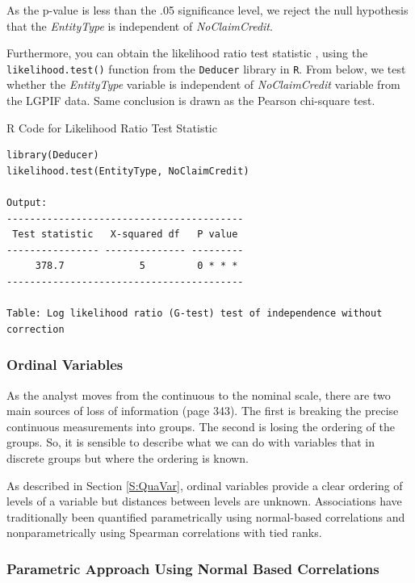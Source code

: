 \documentclass[]{book}
\theoremstyle{definition}
\theoremstyle{definition}
\theoremstyle{definition}
\theoremstyle{remark}
\begin{document}
As the p-value is less than the .05 significance level, we reject the
null hypothesis that the \emph{EntityType} is independent of
\emph{NoClaimCredit}.

Furthermore, you can obtain the likelihood ratio test statistic , using
the \texttt{likelihood.test()} function from the \texttt{Deducer}
library in \texttt{R}. From below, we test whether the \emph{EntityType}
variable is independent of \emph{NoClaimCredit} variable from the LGPIF
data. Same conclusion is drawn as the Pearson chi-square test.

R Code for Likelihood Ratio Test Statistic

\hypertarget{display.lik.2}{}
\begin{verbatim}
library(Deducer)
likelihood.test(EntityType, NoClaimCredit)

Output:
-----------------------------------------
 Test statistic   X-squared df   P value 
---------------- -------------- ---------
     378.7             5         0 * * * 
-----------------------------------------

Table: Log likelihood ratio (G-test) test of independence without correction
\end{verbatim}

\subsubsection{Ordinal Variables}\label{ordinal-variables}

As the analyst moves from the continuous to the nominal scale, there are
two main sources of loss of information \citep{bishop1975discrete} (page
343). The first is breaking the precise continuous measurements into
groups. The second is losing the ordering of the groups. So, it is
sensible to describe what we can do with variables that in discrete
groups but where the ordering is known.

As described in Section \ref{S:QuaVar}, ordinal variables provide a
clear ordering of levels of a variable but distances between levels are
unknown. Associations have traditionally been quantified parametrically
using normal-based correlations and nonparametrically using Spearman
correlations with tied ranks.

\subsubsection{Parametric Approach Using Normal Based
Correlations}\label{parametric-approach-using-normal-based-correlations}
\end{document}
